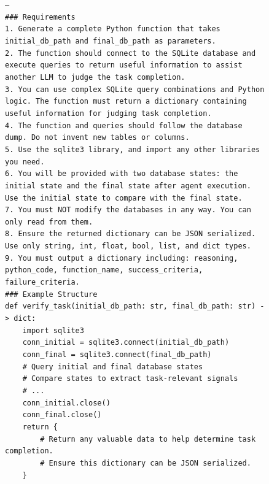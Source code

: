 \begin{figure}[t]
{\begin{minipage}{0.97\textwidth}
        \texttt{---}\\[3pt]
        \texttt{\#\#\# Requirements}\\
        \texttt{1. Generate a complete Python function that takes initial\_db\_path and final\_db\_path as parameters.}\\
        \texttt{2. The function should connect to the SQLite database and execute queries to return useful information to assist another LLM to judge the task completion.}\\
        \texttt{3. You can use complex SQLite query combinations and Python logic. The function must return a dictionary containing useful information for judging task completion.}\\
        \texttt{4. The function and queries should follow the database dump. Do not invent new tables or columns.}\\
        \texttt{5. Use the sqlite3 library, and import any other libraries you need.}\\
        \texttt{6. You will be provided with two database states: the initial state and the final state after agent execution. Use the initial state to compare with the final state.}\\
        \texttt{7. You must NOT modify the databases in any way. You can only read from them.}\\
        \texttt{8. Ensure the returned dictionary can be JSON serialized. Use only string, int, float, bool, list, and dict types.}\\
        \texttt{9. You must output a dictionary including: reasoning, python\_code, function\_name, success\_criteria, failure\_criteria.}\\[6pt]
        \texttt{\#\#\# Example Structure}\\[3pt]
        \texttt{def verify\_task(initial\_db\_path: str, final\_db\_path: str) -> dict:}\\
        \texttt{~~~~import sqlite3}\\[2pt]
        \texttt{~~~~conn\_initial = sqlite3.connect(initial\_db\_path)}\\
        \texttt{~~~~conn\_final = sqlite3.connect(final\_db\_path)}\\[2pt]
        \texttt{~~~~\# Query initial and final database states}\\
        \texttt{~~~~\# Compare states to extract task-relevant signals}\\
        \texttt{~~~~\# ...}\\[2pt]
        \texttt{~~~~conn\_initial.close()}\\
        \texttt{~~~~conn\_final.close()}\\[2pt]
        \texttt{~~~~return \{}\\
        \texttt{~~~~~~~~\# Return any valuable data to help determine task completion.}\\
        \texttt{~~~~~~~~\# Ensure this dictionary can be JSON serialized.}\\
        \texttt{~~~~\}}\\[6pt]


\end{minipage}}
\end{figure}
